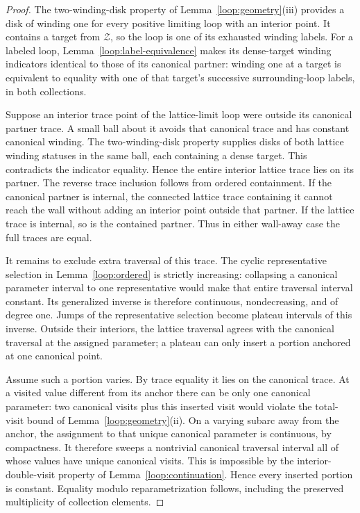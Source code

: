\begin{proof}
The two-winding-disk property of Lemma~\ref{loop:geometry}(iii)
provides a disk of winding one for every positive limiting loop with
an interior point.  It contains a target from $\mathcal Z$, so the
loop is one of its exhausted winding labels.  For a labeled loop,
Lemma~\ref{loop:label-equivalence} makes its dense-target winding
indicators identical to those of its canonical partner: winding one
at a target is equivalent to equality with one of that target's
successive surrounding-loop labels, in both collections.

Suppose an interior trace point of the lattice-limit loop were outside
its canonical partner trace.  A small ball about it avoids that
canonical trace and has constant canonical winding.  The two-winding-disk
property supplies disks of both lattice winding statuses in the
same ball, each containing a dense target.  This contradicts the
indicator equality.  Hence the entire interior lattice trace lies
on its partner.  The reverse trace inclusion follows from ordered
containment.  If the canonical partner is internal, the connected
lattice trace containing it cannot reach the wall without adding an
interior point outside that partner.  If the lattice trace is internal,
so is the contained partner.  Thus in either wall-away case the full
traces are equal.

It remains to exclude extra traversal of this trace.  The cyclic
representative selection in Lemma~\ref{loop:ordered} is strictly
increasing: collapsing a canonical parameter interval to one
representative would make that entire traversal interval constant.
Its generalized inverse is therefore continuous, nondecreasing, and
of degree one.  Jumps of the representative selection become plateau
intervals of this inverse.  Outside their interiors, the lattice
traversal agrees with the canonical traversal at the assigned
parameter; a plateau can only insert a portion anchored at one
canonical point.

Assume such a portion varies.  By trace equality it lies on the
canonical trace.  At a visited value different from its anchor there
can be only one canonical parameter: two canonical visits plus this
inserted visit would violate the total-visit bound of
Lemma~\ref{loop:geometry}(ii).  On a varying subarc away from the
anchor, the assignment to that unique canonical parameter is
continuous, by compactness.  It therefore sweeps a nontrivial canonical
traversal interval all of whose values have unique canonical visits.
This is impossible by the interior-double-visit property of
Lemma~\ref{loop:continuation}.  Hence every inserted portion is
constant.  Equality modulo reparametrization follows, including the
preserved multiplicity of collection elements.
\end{proof}


